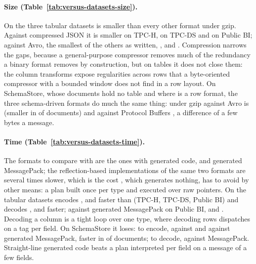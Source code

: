 \paragraph{Size (Table~\ref{tab:versus-datasets-size}).} On the three
tabular datasets \colbin{} is smaller than every other format under gzip.
Against compressed JSON it is  smaller on
TPC-H,  on TPC-DS and
 on Public BI; against Avro, the
smallest of the others as written, ,
 and .
Compression narrows the gaps, because a general-purpose compressor removes
much of the redundancy a binary format removes by construction, but on
tables it does not close them: the column transforms expose regularities
across rows that a byte-oriented compressor with a bounded window does not
find in a row layout. On SchemaStore, whose documents hold no table and
where \colbin{} is a row format, the three schema-driven formats do much the
same thing: under gzip \colbin{} against Avro is
 (smaller in
 of
 documents) and against Protocol
Buffers , a difference of a few
bytes a message.

\paragraph{Time (Table~\ref{tab:versus-datasets-time}).} The formats to
compare with are the ones with generated code,  and
generated MessagePack; the reflection-based implementations of the same two
formats are several times slower, which is the cost \colbin{}, which
generates nothing, has to avoid by other means: a plan built once per type
and executed over raw pointers. On the tabular datasets \colbin{} encodes
, 
and  faster than 
(TPC-H, TPC-DS, Public BI) and decodes
,
 and
 faster; against generated
MessagePack on Public BI,  and
. Decoding a column is a tight
loop over one type, where decoding rows dispatches on a tag per field. On
SchemaStore it loses: to encode, 
against  and 
against generated MessagePack, faster in
 of
 documents; to decode,
 against MessagePack.
Straight-line generated code beats a plan interpreted per field on a message
of a few fields.


